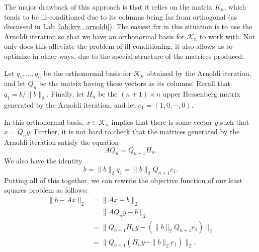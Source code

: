 The major drawback of this approach is that it relies on the matrix $K_n$, which tends to be ill-conditioned due to its columns
being far from orthogonal (as discussed in Lab \ref{lab:kry_arnoldi}).
The easiest fix in this situation is to use the Arnoldi iteration so that we have an orthonormal basis for $\mathcal{K}_n$ to work with.
Not only does this alleviate the problem of ill-conditioning, it also allows us to optimize in other ways, due to the special 
structure of the matrices produced.

Let $q_1,\ldots, q_n$ be the orthonormal basis for $\mathcal{K}_n$ obtained by the Arnoldi iteration, and let $Q_n$ be the matrix 
having these vectors as its columns.
Recall that $q_1 = b/\|b\|_2$.
Finally, let $H_n$ be the $(n+1)\times n$ upper Hessenberg matrix generated by the Arnoldi iteration, and let $e_1=(1,0,\cdots,0)$.

In this orthonormal basis, $x \in \mathcal{K}_n$ implies that there is some vector $y$ such that $x = Q_n y$.
Further, it is not hard to check that the matrices generated by the Arnoldi iteration satisfy the equation
\[
AQ_n = Q_{n+1}H_n.
\]
We also have the identity
\[
b = \|b\|_2q_1 = \|b\|_2Q_{n+1}e_1.
\]
Putting all of this together, we can rewrite the objective function of our least squares problem as follows:
\begin{align*}
\|b - Ax\|_2 &= \|Ax - b\|_2\\
&= \|AQ_ny - b\|_2\\
&= \|Q_{n+1}H_ny - \left(\|b\|_2Q_{n+1}e_1\right)\|_2\\
&= \|Q_{n+1}\left(H_n y - \|b\|_2e_1\right)\|_2.
\end{align*}

